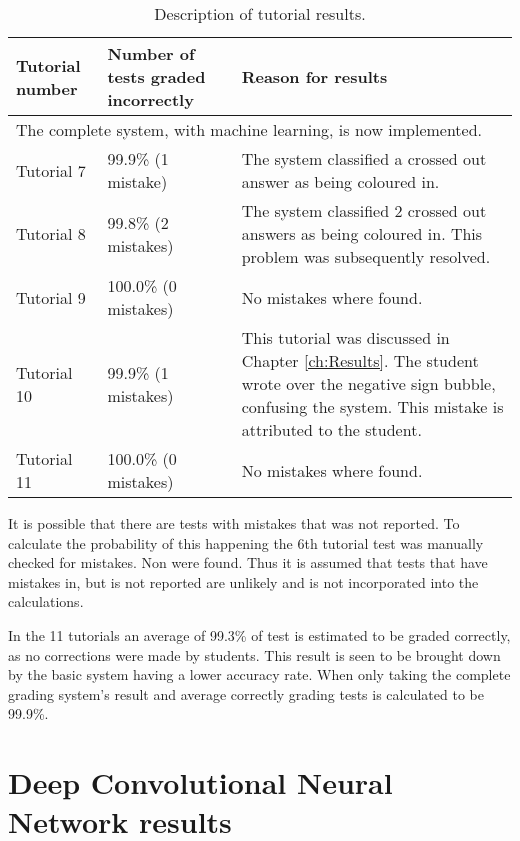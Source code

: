 \begin{table}
\caption{Description of tutorial results.} \label{tbl:tutResults2}
  \centering
\begin{tabular}{|p{2cm}|p{4cm}|p{5cm}|}
\hline
\textbf{Tutorial number}&\textbf{Number of tests graded incorrectly}&\textbf{Reason for results}\\
\hline
\multicolumn{3}{|l|}{The complete system,  with machine learning, is now implemented.}\\
\hline
Tutorial 7&99.9\% (1 mistake)&The system classified a crossed out answer as being coloured in.\\
\hline
Tutorial 8&99.8\% (2 mistakes)&The system classified 2 crossed out answers as being coloured in. This problem was subsequently resolved.\\
\hline
Tutorial 9&100.0\% (0 mistakes)&No mistakes where found.\\
\hline
Tutorial 10&99.9\% (1 mistakes)&This tutorial was discussed in Chapter \ref{ch:Results}. The student wrote over the negative sign bubble, confusing the system. This mistake is attributed to the student.\\
\hline
Tutorial 11&100.0\% (0 mistakes)&No mistakes where found.\\
\hline
\end{tabular}
\end{table}

It is possible that there are tests with mistakes that was not reported. To calculate the probability of this happening the 6th tutorial test was manually checked for mistakes. Non were found. Thus it is assumed that tests that have mistakes in, but is not reported are unlikely and is not incorporated into the calculations.

In the 11 tutorials an average of 99.3\% of test is estimated to be graded correctly, as no corrections were made by students.  This result is seen to be brought down by the basic system having a lower accuracy rate. When only taking the complete grading system's result and average correctly grading tests is calculated to be 99.9\%.


\section{Deep Convolutional Neural Network results}
\label{sec:DCNNresult}

